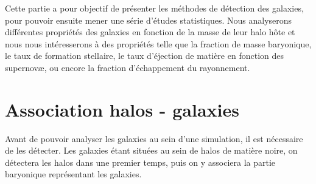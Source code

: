 
Cette partie a pour objectif de présenter les méthodes de détection des galaxies, pour pouvoir ensuite mener une série d'études statistiques.
Nous analyserons différentes propriétés des galaxies en fonction de la masse de leur halo hôte et nous nous intéresserons à des propriétés telle que la fraction de masse baryonique, le taux de formation stellaire, le taux d'éjection de matière en fonction des supernovæ, ou encore la fraction d'échappement du rayonnement.




\section{Association halos - galaxies}




Avant de pouvoir analyser les galaxies au sein d'une simulation, il est nécessaire de les détecter.
Les galaxies étant situées au sein de halos de matière noire, on détectera les halos dans une premier temps, puis on y associera la partie baryonique représentant les galaxies.

